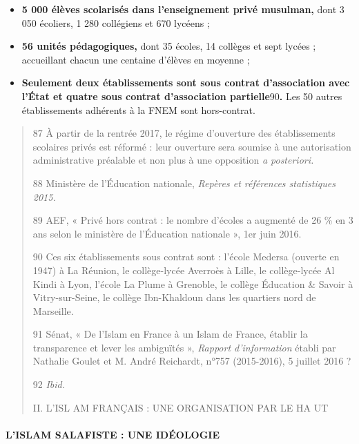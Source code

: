 \begin{itemize}
\item
  \textbf{5 000 élèves scolarisés dans l'enseignement privé musulman,}
  dont 3 050 écoliers, 1 280 collégiens et 670 lycéens ;
\item
  \textbf{56 unités pédagogiques,} dont 35 écoles, 14 collèges et sept
  lycées ; accueillant chacun une centaine d'élèves en moyenne ;
\end{itemize}

\begin{itemize}
\item
  \textbf{Seulement deux établissements sont sous contrat d'association
  avec l'État et quatre sous contrat d'association
  partielle}90\textbf{.} Les 50 autres établissements adhérents à la
  FNEM sont hors-contrat.
\end{itemize}

\begin{quote}
87 À partir de la rentrée 2017, le régime d'ouverture des établissements
scolaires privés est réformé : leur ouverture sera soumise à une
autorisation administrative préalable et non plus à une opposition
\emph{a posteriori.}

88 Ministère de l'Éducation nationale, \emph{Repères et références
statistiques 2015.}

89 AEF, « Privé hors contrat : le nombre d'écoles a augmenté de 26 \% en
3 ans selon le ministère de l'Éducation nationale », 1er juin 2016.

90 Ces six établissements sous contrat sont : l'école Medersa (ouverte
en 1947) à La Réunion, le collège-lycée Averroès à Lille, le
collège-lycée Al Kindi à Lyon, l'école La Plume à Grenoble, le collège
Éducation \& Savoir à Vitry-sur-Seine, le collège Ibn-Khaldoun dans les
quartiers nord de Marseille.



91 Sénat, « De l'Islam en France à un Islam de France, établir la
transparence et lever les ambiguïtés », \emph{Rapport d'information}
établi par Nathalie Goulet et M. André Reichardt, n°757 (2015-2016), 5
juillet 2016 ?

92 \emph{Ibid.}

II. L'ISL AM FRANÇAIS : UNE ORGANISATION PAR LE HA UT
\end{quote}

\hypertarget{lislam-salafiste-une-iduxe9ologie}{%
\paragraph{L'ISLAM SALAFISTE : UNE
IDÉOLOGIE}\label{lislam-salafiste-une-iduxe9ologie}}

